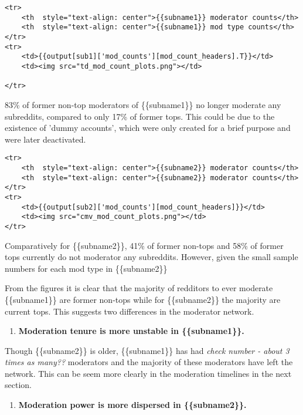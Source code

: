 \documentclass[11pt]{article}
\providecommand{\tightlist}{%
      \setlength{\itemsep}{0pt}\setlength{\parskip}{0pt}}
\begin{document}
\begin{verbatim}
<tr>
    <th  style="text-align: center">{{subname1}} moderator counts</th>
    <th  style="text-align: center">{{subname1}} mod type counts</th>
</tr>
<tr>
    <td>{{output[sub1]['mod_counts'][mod_count_headers].T}}</td>
    <td><img src="td_mod_count_plots.png"></td>

</tr>
\end{verbatim}

    83\% of former non-top moderators of \{\{subname1\}\} no longer moderate
any subreddits, compared to only 17\% of former tops. This could be due
to the existence of 'dummy accounts', which were only created for a
brief purpose and were later deactivated.

\begin{verbatim}
<tr>
    <th  style="text-align: center">{{subname2}} moderator counts</th>
    <th  style="text-align: center">{{subname2}} moderator counts</th>
</tr>
<tr>
    <td>{{output[sub2]['mod_counts'][mod_count_headers]}}</td>
    <td><img src="cmv_mod_count_plots.png"></td>
</tr>
\end{verbatim}

    Comparatively for \{\{subname2\}\}, 41\% of former non-tops and 58\% of
former tops currently do not moderator any subreddits. However, given
the small sample numbers for each mod type in \{\{subname2\}\}

From the figures it is clear that the majority of redditors to ever
moderate \{\{subname1\}\} are former non-tops while for \{\{subname2\}\}
the majority are current tops. This suggests two differences in the
moderator network.

\begin{enumerate}
\def\labelenumi{\arabic{enumi})}
\tightlist
\item
  \textbf{Moderation tenure is more unstable in \{\{subname1\}\}.}
\end{enumerate}

Though \{\{subname2\}\} is older, \{\{subname1\}\} has had \emph{check
number - about 3 times as many??} moderators and the majority of these
moderators have left the network. This can be seem more clearly in the
moderation timelines in the next section.

\begin{enumerate}
\def\labelenumi{\arabic{enumi})}
\setcounter{enumi}{1}
\tightlist
\item
  \textbf{Moderation power is more dispersed in \{\{subname2\}\}.}
\end{enumerate}
\end{document}
